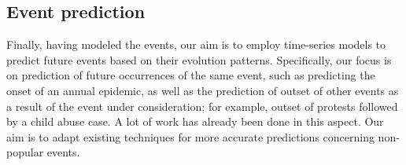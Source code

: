 \subsection{Event prediction}
Finally, having modeled the events, our aim is to employ time-series models to predict future events based on their evolution patterns. Specifically, our focus is on prediction of future occurrences of the same event, such as predicting the onset of an annual epidemic, as well as the prediction of outset of other events as a result of the event under consideration; for example, outset of protests followed by a child abuse case. A lot of work has already been done in this aspect. Our aim is to adapt existing techniques for more accurate predictions concerning non-popular events.
